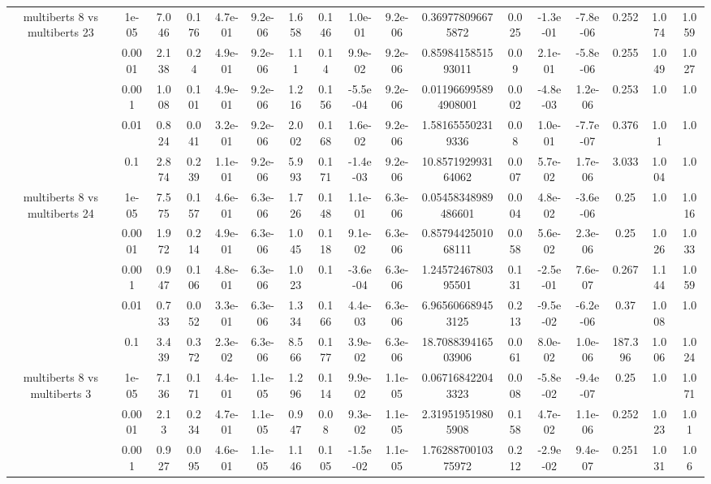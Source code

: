 \begin{tabular}{|c|c|c|c|c|c|c|c|c|c|c|c|c|c|c|c|c|}
\hline
\multirow{5}{*}{multiberts 8 vs multiberts 23} & 1e-05 & 7.046 & 0.176 & 4.7e-01 & 9.2e-06 & 1.658 & 0.146 & 1.0e-01 & 9.2e-06 & 0.369778096675872 & 0.025 & -1.3e-01 & -7.8e-06 & 0.252 & 1.074 & 1.059 \\
 & 0.0001 & 2.138 & 0.24 & 4.9e-01 & 9.2e-06 & 1.11 & 0.14 & 9.9e-02 & 9.2e-06 & 0.8598415851593011 & 0.09 & 2.1e-01 & -5.8e-06 & 0.255 & 1.049 & 1.027 \\
 & 0.001 & 1.008 & 0.101 & 4.9e-01 & 9.2e-06 & 1.216 & 0.156 & -5.5e-04 & 9.2e-06 & 0.011966995894908001 & 0.002 & -4.8e-03 & 1.2e-06 & 0.253 & 1.0 & 1.0 \\
 & 0.01 & 0.824 & 0.041 & 3.2e-01 & 9.2e-06 & 2.002 & 0.168 & 1.6e-02 & 9.2e-06 & 1.581655502319336 & 0.08 & 1.0e-01 & -7.7e-07 & 0.376 & 1.01 & 1.0 \\
 & 0.1 & 2.874 & 0.239 & 1.1e-01 & 9.2e-06 & 5.993 & 0.171 & -1.4e-03 & 9.2e-06 & 10.857192993164062 & 0.007 & 5.7e-02 & 1.7e-06 & 3.033 & 1.004 & 1.0 \\
\hline
\multirow{5}{*}{multiberts 8 vs multiberts 24} & 1e-05 & 7.575 & 0.157 & 4.6e-01 & 6.3e-06 & 1.726 & 0.148 & 1.1e-01 & 6.3e-06 & 0.05458348989486601 & 0.004 & 4.8e-02 & -3.6e-06 & 0.25 & 1.0 & 1.016 \\
 & 0.0001 & 1.972 & 0.214 & 4.9e-01 & 6.3e-06 & 1.045 & 0.118 & 9.1e-02 & 6.3e-06 & 0.8579442501068111 & 0.058 & 5.6e-02 & 2.3e-06 & 0.25 & 1.026 & 1.033 \\
 & 0.001 & 0.947 & 0.106 & 4.8e-01 & 6.3e-06 & 1.023 & 0.1 & -3.6e-04 & 6.3e-06 & 1.2457246780395501 & 0.131 & -2.5e-01 & 7.6e-07 & 0.267 & 1.144 & 1.059 \\
 & 0.01 & 0.733 & 0.052 & 3.3e-01 & 6.3e-06 & 1.334 & 0.166 & 4.4e-03 & 6.3e-06 & 6.965606689453125 & 0.213 & -9.5e-02 & -6.2e-06 & 0.37 & 1.008 & 1.0 \\
 & 0.1 & 3.439 & 0.372 & 2.3e-02 & 6.3e-06 & 8.566 & 0.177 & 3.9e-02 & 6.3e-06 & 18.708839416503906 & 0.061 & 8.0e-02 & 1.0e-06 & 187.396 & 1.006 & 1.024 \\
\hline
\multirow{5}{*}{multiberts 8 vs multiberts 3} & 1e-05 & 7.136 & 0.171 & 4.4e-01 & 1.1e-05 & 1.296 & 0.114 & 9.9e-02 & 1.1e-05 & 0.067168422043323 & 0.008 & -5.8e-02 & -9.4e-07 & 0.25 & 1.0 & 1.071 \\
 & 0.0001 & 2.13 & 0.234 & 4.7e-01 & 1.1e-05 & 0.947 & 0.08 & 9.3e-02 & 1.1e-05 & 2.319519519805908 & 0.158 & 4.7e-02 & 1.1e-06 & 0.252 & 1.023 & 1.01 \\
 & 0.001 & 0.927 & 0.095 & 4.6e-01 & 1.1e-05 & 1.146 & 0.105 & -1.5e-02 & 1.1e-05 & 1.7628870010375972 & 0.212 & -2.9e-02 & 9.4e-07 & 0.251 & 1.031 & 1.06 \\

\end{tabular}
